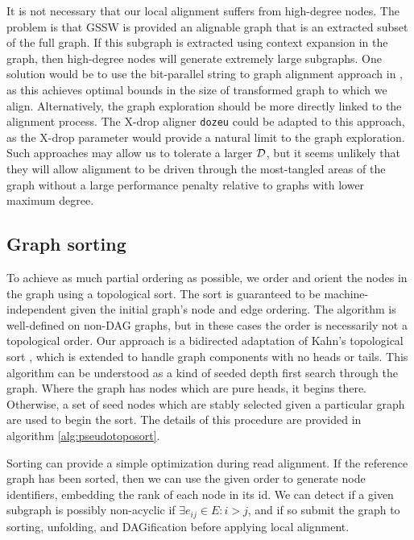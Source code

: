 \documentclass[a4paper,12pt,numbered,oneside]{Classes/PhDThesisPSnPDF}
\begin{document}
It is not necessary that our local alignment suffers from high-degree nodes.
The problem is that GSSW is provided an alignable graph that is an extracted subset of the full graph.
If this subgraph is extracted using context expansion in the graph, then high-degree nodes will generate extremely large subgraphs.
One solution would be to use the bit-parallel string to graph alignment approach in \cite{rautiainen2018bit}, as this achieves optimal bounds in the size of transformed graph to which we align.
Alternatively, the graph exploration should be more directly linked to the alignment process.
The X-drop aligner {\tt dozeu} could be adapted to this approach, as the X-drop parameter would provide a natural limit to the graph exploration.
Such approaches may allow us to tolerate a larger ${\cal D}$, but it seems unlikely that they will allow alignment to be driven through the most-tangled areas of the graph without a large performance penalty relative to graphs with lower maximum degree.

\subsection{Graph sorting}

To achieve as much partial ordering as possible, we order and orient the nodes in the graph using a topological sort.
The sort is guaranteed to be machine-independent given the initial graph's node and edge ordering.
The algorithm is well-defined on non-DAG graphs, but in these cases the order is necessarily not a topological order.
Our approach is a bidirected adaptation of Kahn's topological sort \cite{kahn1962topological}, which is extended to handle graph components with no heads or tails.
This algorithm can be understood as a kind of seeded depth first search through the graph.
Where the graph has nodes which are pure heads, it begins there.
Otherwise, a set of seed nodes which are stably selected given a particular graph are used to begin the sort.
The details of this procedure are provided in algorithm \ref{alg:pseudotoposort}.

Sorting can provide a simple optimization during read alignment.
If the reference graph has been sorted, then we can use the given order to generate node identifiers, embedding the rank of each node in its id.
We can detect if a given subgraph is possibly non-acyclic if $\exists e_{ij} \in E : i > j$, and if so submit the graph to sorting, unfolding, and DAGification before applying local alignment.
\end{document}
